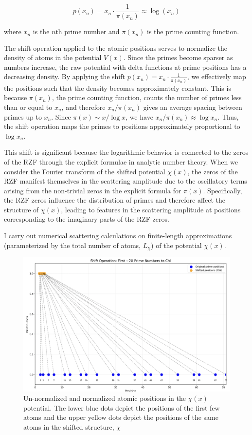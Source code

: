 \documentclass[11pt, oneside]{article}
\begin{document}
\begin{equation}
p(x_n) = x_n \cdot \frac{1}{\pi(x_n)} \approx \log(x_n)
\end{equation}

where $x_n$ is the $n$th prime number and $\pi(x_n)$ is the prime counting function.

The shift operation applied to the atomic positions serves to normalize the density of atoms in the potential $V(x)$. Since the primes become sparser as numbers increase, the raw potential with delta functions at prime positions has a decreasing density. By applying the shift $p(x_n) = x_n \cdot \frac{1}{\pi(x_n)}$, we effectively map the positions such that the density becomes approximately constant. This is because $\pi(x_n)$, the prime counting function, counts the number of primes less than or equal to $x_n$, and therefore $x_n / \pi(x_n)$ gives an average spacing between primes up to $x_n$. Since $\pi(x) \sim x / \log x$, we have $x_n / \pi(x_n) \approx \log x_n$. Thus, the shift operation maps the primes to positions approximately proportional to $\log x_n$.

This shift is significant because the logarithmic behavior is connected to the zeros of the RZF through the explicit formulae in analytic number theory. When we consider the Fourier transform of the shifted potential $\chi(x)$, the zeros of the RZF manifest themselves in the scattering amplitude due to the oscillatory terms arising from the non-trivial zeros in the explicit formula for $\pi(x)$. Specifically, the RZF zeros influence the distribution of primes and therefore affect the structure of $\chi(x)$, leading to features in the scattering amplitude at positions corresponding to the imaginary parts of the RZF zeros.

I carry out numerical scattering calculations on finite-length approximations (parameterized by the total number of atoms, $L_{\chi}$) of the potential $\chi(x)$.

\begin{figure}[htbp]
\begin{center}
    \includegraphics[width=0.8\linewidth]{normalizing.png}
\caption{Un-normalized and normalized atomic positions in the $\chi(x)$ potential. The lower blue dots depict the positions of the first few atoms and the upper yellow dots depict the positions of the same atoms in the shifted structure, $\chi$}
\label{fig:normalized_positions}
\end{center}
\end{figure}
\end{document}
